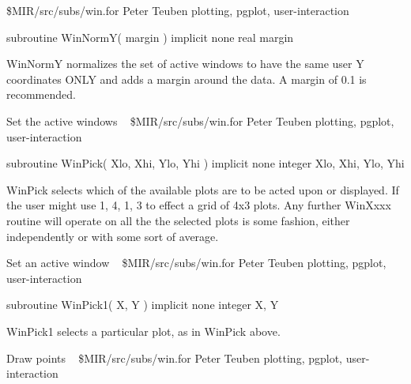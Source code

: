 \newline {} \$MIR/src/subs/win.for
\newline {} Peter Teuben
\newline {} plotting, pgplot, user-interaction
\par{\tenpoint
{\eightpoint\begintt
        subroutine WinNormY( margin )
        implicit none
        real margin

    WinNormY normalizes the set of active windows to have the same user
    Y coordinates ONLY and adds a margin around the data.  A margin of
    0.1 is recommended.
\endtt}
\par}
%
\noindent Set the active windows
\newline \ 
\newline {} \$MIR/src/subs/win.for
\newline {} Peter Teuben
\newline {} plotting, pgplot, user-interaction
\par{\tenpoint
{\eightpoint\begintt
        subroutine WinPick( Xlo, Xhi, Ylo, Yhi )
        implicit none
        integer Xlo, Xhi, Ylo, Yhi

    WinPick selects which of the available plots are to be acted upon or
    displayed.  If the user might use { 1, 4, 1, 3 } to effect a grid of
    4x3 plots.  Any further WinXxxx routine will operate on all the the
    selected plots is some fashion, either independently or with some sort
    of average.
\endtt}
\par}
%
\noindent Set an active window
\newline \ 
\newline {} \$MIR/src/subs/win.for
\newline {} Peter Teuben
\newline \abox{Keywords:} plotting, pgplot, user-interaction
\par{\tenpoint
{\eightpoint\begintt
        subroutine WinPick1( X, Y )
        implicit none
        integer X, Y

    WinPick1 selects a particular plot, as in WinPick above.
\endtt}
\par}
%
\noindent Draw points
\newline \ 
\newline {} \$MIR/src/subs/win.for
\newline {} Peter Teuben
\newline {} plotting, pgplot, user-interaction
